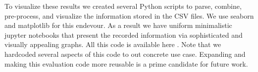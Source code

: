 To visualize these results we created several Python scripts to parse, combine, pre-process, and visualize the information stored in the CSV files.
We use seaborn and matplotlib for this endevour.
As a result we have uniform minimalistic jupyter notebooks that present the recorded information via sophisticated and visually appealing graphs.
All this code is available here \cite{cli_code}.
Note that we hardcoded several aspects of this code to out concrete use case.
Expanding and making this evaluation code more reusable is a prime candidate for future work.